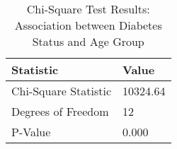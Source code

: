 
\begin{table}[h!]
\centering
\begin{tabular}{|l|l|}
\hline
\textbf{Statistic}       & \textbf{Value} \\ \hline
Chi-Square Statistic        & 10324.64       \\ \hline
Degrees of Freedom          & 12          \\ \hline
P-Value                     & 0.000         \\ \hline
\end{tabular}

\vspace{0.5cm} %

\caption{Chi-Square Test Results: Association between Diabetes Status and Age Group}
\label{tab:chi_square_age_group_results}
\end{table}
